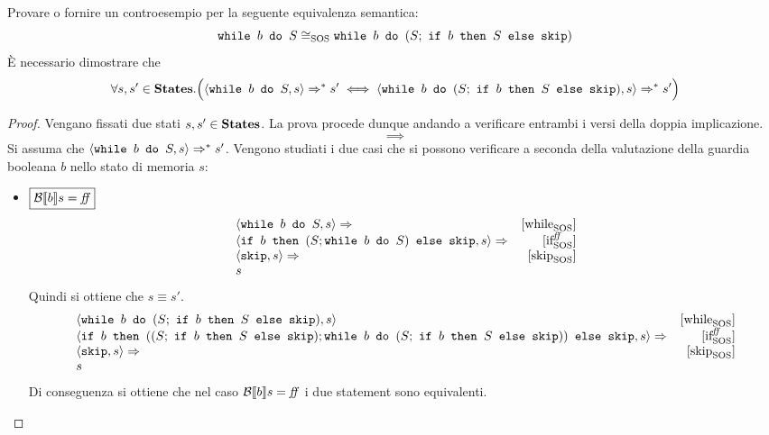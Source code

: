 {
  Provare o fornire un controesempio per la seguente equivalenza semantica: \\
  $$
   \wbS{b}{S} \eqSOS{} \wbS{b}{(S;\ \ifABC{b}{S}{\skipForFriends})}
  $$
}
{
È necessario dimostrare che
$$
\forall s,s' \in \states. 
  \Big(\confSs{\wbS{b}{S}}{s} \Rar{*} s'
  \iff
  \confSs{\wbS{b}{(S;\ \ifABC{b}{S}{\skipForFriends})}}{s} \Rar{*} s' \Big)
$$
}
\begin{proof}
Vengano fissati due stati $s, s' \in \states$. La prova procede dunque andando
a verificare entrambi i versi della doppia implicazione.
$$
\boxed{\implies}
$$
Si assuma che $\confSs{\wbS{b}{S}}{s} \Rar{*} s'$. Vengono studiati i due casi
che si possono verificare a seconda della valutazione della guardia booleana $b$
nello stato di memoria $s$:
\begin{itemize}
  \item $\boxed{\B{b} = \semfalse}$
  $$
  \begin{array}{lr}
  \confSs{\wbS{b}{S}}{s} \Rar{ } & \whileSOS \\
  \confSs{\ifABC{b}{(S; \wbS{b}{S})}{\skipForFriends}}{s} \Rar{ }& \ifffSOS \\
  \confSs{\skipForFriends}{s} \Rar{} & \skipSOS\\
  s
  \end{array}
  $$
  Quindi si ottiene che $s \equiv{} s'$.
  $$
  \begin{array}{lr}
  \confSs{\wbS{b}{(S;\ \ifABC{b}{S}{\skipForFriends})}}{s} & \whileSOS \\
  \confSs{\ifABC{b}
            {((S;\ \ifABC{b}{S}{\skipForFriends});
              \wbS{b}{(S;\ \ifABC{b}{S}{\skipForFriends})})}
            {\skipForFriends}
         }{s} \Rar{ }& \ifffSOS \\
  \confSs{\skipForFriends}{s} \Rar{} & \skipSOS\\
  s
  \end{array}
  $$
  Di conseguenza si ottiene che nel caso $\B{b} = \semfalse$ i due
  statement sono equivalenti.


\end{itemize}
\end{proof}
